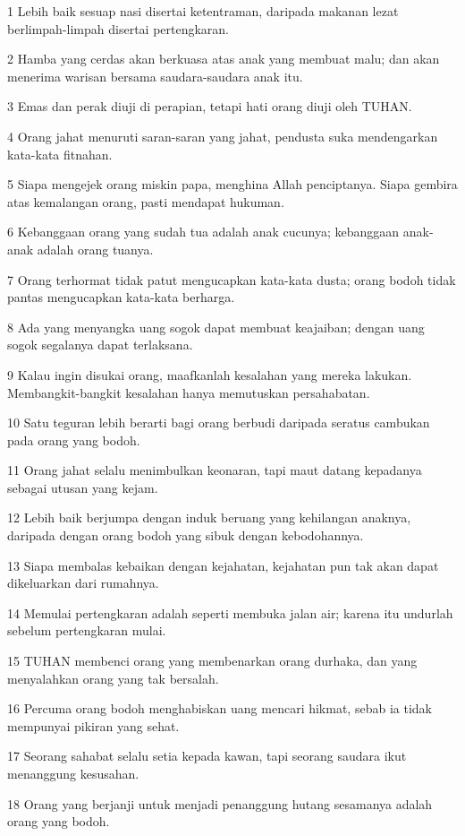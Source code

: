 \par 1 Lebih baik sesuap nasi disertai ketentraman, daripada makanan lezat berlimpah-limpah disertai pertengkaran.
\par 2 Hamba yang cerdas akan berkuasa atas anak yang membuat malu; dan akan menerima warisan bersama saudara-saudara anak itu.
\par 3 Emas dan perak diuji di perapian, tetapi hati orang diuji oleh TUHAN.
\par 4 Orang jahat menuruti saran-saran yang jahat, pendusta suka mendengarkan kata-kata fitnahan.
\par 5 Siapa mengejek orang miskin papa, menghina Allah penciptanya. Siapa gembira atas kemalangan orang, pasti mendapat hukuman.
\par 6 Kebanggaan orang yang sudah tua adalah anak cucunya; kebanggaan anak-anak adalah orang tuanya.
\par 7 Orang terhormat tidak patut mengucapkan kata-kata dusta; orang bodoh tidak pantas mengucapkan kata-kata berharga.
\par 8 Ada yang menyangka uang sogok dapat membuat keajaiban; dengan uang sogok segalanya dapat terlaksana.
\par 9 Kalau ingin disukai orang, maafkanlah kesalahan yang mereka lakukan. Membangkit-bangkit kesalahan hanya memutuskan persahabatan.
\par 10 Satu teguran lebih berarti bagi orang berbudi daripada seratus cambukan pada orang yang bodoh.
\par 11 Orang jahat selalu menimbulkan keonaran, tapi maut datang kepadanya sebagai utusan yang kejam.
\par 12 Lebih baik berjumpa dengan induk beruang yang kehilangan anaknya, daripada dengan orang bodoh yang sibuk dengan kebodohannya.
\par 13 Siapa membalas kebaikan dengan kejahatan, kejahatan pun tak akan dapat dikeluarkan dari rumahnya.
\par 14 Memulai pertengkaran adalah seperti membuka jalan air; karena itu undurlah sebelum pertengkaran mulai.
\par 15 TUHAN membenci orang yang membenarkan orang durhaka, dan yang menyalahkan orang yang tak bersalah.
\par 16 Percuma orang bodoh menghabiskan uang mencari hikmat, sebab ia tidak mempunyai pikiran yang sehat.
\par 17 Seorang sahabat selalu setia kepada kawan, tapi seorang saudara ikut menanggung kesusahan.
\par 18 Orang yang berjanji untuk menjadi penanggung hutang sesamanya adalah orang yang bodoh.
